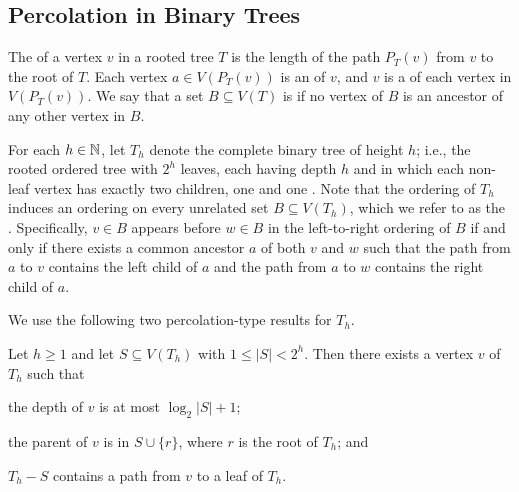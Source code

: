 \documentclass{patmorin}
\renewcommand{\le}{\leqslant}
\renewcommand{\ge}{\geqslant}
\begin{document}
\subsection{Percolation in Binary Trees}


The  of a vertex $v$ in a rooted tree $T$ is the length of the path $P_T(v)$ from $v$ to the root of $T$.  Each vertex $a\in V(P_T(v))$ is an  of $v$, and $v$ is a  of each vertex in $V(P_T(v))$.  We say that a set $B\subseteq V(T)$ is  if no vertex of $B$ is an ancestor of any other vertex in $B$.

For each $h\in\mathbb{N}$, let $T_h$ denote the complete binary tree of height $h$; i.e., the rooted ordered tree with $2^h$ leaves, each having depth $h$ and in which each non-leaf vertex has exactly two children, one  and one .  Note that the ordering of $T_h$ induces an ordering on every unrelated set $B\subseteq V(T_h)$, which we refer to as the .  Specifically, $v\in B$ appears before $w\in B$ in the left-to-right ordering of $B$ if and only if there exists a common ancestor $a$ of both $v$ and $w$ such that the path from $a$ to $v$ contains the left child of $a$ and the path from $a$ to $w$ contains the right child of $a$.

We use the following two percolation-type results for $T_h$.

\begin{lem}\label{one_path}
  Let $h\ge 1$
  and let $S\subseteq V(T_h)$ with $1\le |S|< 2^h$. Then there exists a vertex $v$ of $T_h$ such that
  \begin{compactenum}[(i)]
    \item the depth of $v$ is at most $\log_2|S|+1$;
    \item the parent of $v$ is in $S\cup\{r\}$, where $r$ is the root of $T_h$; and
    \item $T_h-S$ contains a path from $v$ to a leaf of $T_h$.
  \end{compactenum}
\end{lem}
\end{document}
